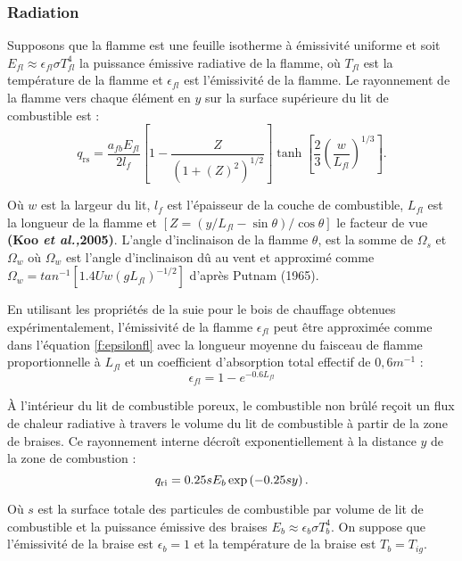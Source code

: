 \documentclass[12pt, oneside]{report} %
\theoremstyle{definition}
\theoremstyle{remark}
\begin{document}
		\subsubsection{Radiation}
		Supposons que la flamme est une feuille isotherme à émissivité uniforme et soit \\ $E_{fl} \approx \epsilon_{fl}\sigma T_{fl}^4$ la puissance émissive radiative de la flamme, où $ T_{fl}$  est la température de la flamme et $\epsilon_{fl}$ est l'émissivité de la flamme. Le rayonnement de la flamme vers chaque élément en $y$ sur la surface supérieure du lit de combustible est  : 
		\begin{equation}\label{f:q_sr}
			q_{\text{rs}} = \frac{a_{fb}E_{fl}}{2l_f}\left[1-\frac{Z}{\left({1+(Z)^2}\right)^{1/2}}\right]\tanh\left[\frac{2}{3}\left(\frac{w}{L_{fl}}\right)^{1/3}\right].
		\end{equation}
		
		Où $w$ est la largeur du lit, $l_f$ est l'épaisseur de la couche de combustible, $L_{fl}$ est la longueur de la flamme et $\left[Z = (y/L_{fl }- \sin\theta)/ \cos\theta\right]$ le facteur de vue \textbf{(Koo \textit{et al.,}2005)}. L'angle d'inclinaison de la flamme $\theta$, est la somme de $ \Omega_s $ et $ \Omega_w $ où $ \Omega_w $ est l'angle d'inclinaison dû au vent et approximé comme $\Omega_w = tan^{-1}[1.4Uw(gL_{fl})^{-1/2}]$ d'après Putnam (1965).
		
	En utilisant les propriétés de la suie pour le bois de chauffage obtenues expérimentalement, l'émissivité de la flamme $\epsilon_{fl}$ peut être approximée comme dans l'équation \eqref{f:epsilonfl} avec la longueur moyenne du faisceau de flamme proportionnelle à $L_{fl}$ et un coefficient d'absorption total effectif de $ 0,6 m^{-1}$ : 
		\begin{equation}\label{f:epsilonfl}
			\epsilon_{fl} = 1 - e^{-0.6L_{fl}}
		\end{equation}  
		
			À l'intérieur du lit de combustible poreux, le combustible non brûlé reçoit un flux de chaleur radiative à travers le volume du lit de combustible à partir de la zone de braises. Ce rayonnement interne décroît exponentiellement à la distance $ y $ de la zone de combustion : 
		\begin{equation}
			q_{\text{ri}} = 0.25sE_b\exp\left(-0.25sy\right).
		\vspace{-0.4cm}
		\end{equation}
	
		Où $s$ est la surface totale des particules de combustible par volume de lit de combustible et la puissance émissive des braises $E_b \approx \epsilon_{b}\sigma T_b^{4}$. On suppose que l'émissivité de la braise est $ \epsilon_{b} = 1 $ et la température de la braise est $T_b = T_{ig}$.
			
\end{document}
